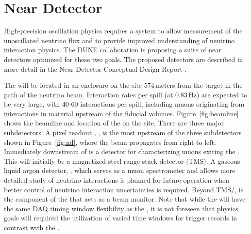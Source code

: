 \documentclass[../main-v1.tex]{subfiles}
\begin{document}



\section{Near Detector }

High-precision oscillation physics requires a  system to allow measurement of the unoscillated neutrino flux and %
to provide improved understanding of neutrino interaction physics. 
The DUNE  collaboration is proposing a suite of near detectors optimized for these two goals. The proposed detectors are described in more detail in the Near Detector Conceptual Design Report \cite{DUNE:2021tad}.
 
 The   will be located in an enclosure on the  site 574\,meters from the target %
 in the path of the neutrino beam.    Interaction rates per spill (at 0.83\,Hz) are expected to be very large, with 40-60 interactions per spill, including muons originating from interactions in material upstream of the fiducial volumes. Figure~\ref{fig:beamline} shows the beamline and location of the  on the  site. There are three major subdetectors:
 A pixel readout %
 , , is  the most upstream of the three subdetectors shown in Figure~\ref{fig:nd}, where the beam propagates  from right to left. Immediately downstream of  is a detector for characterizing muons exiting the . This will initially be a magnetized steel range stack detector (TMS). A gaseous liquid argon detector, , which serves %
 as  a muon spectrometer and allows more detailed study of neutrino interactions is planned for future operation when better control of neutrino interaction uncertainties is required. %
 Beyond TMS/, is the  component of the  that acts as a beam monitor. %
Note that while the  will have the same DAQ timing window flexibility as the , it is not foreseen that  physics goals will required the utilization of varied time windows for trigger records in contrast with the . %
\end{document}
